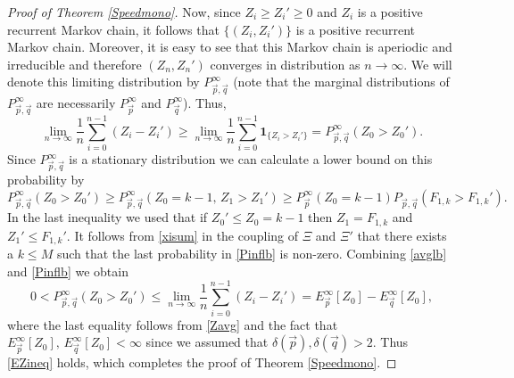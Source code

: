 \documentclass[reqno,letterpaper,11pt]{amsart}
\theoremstyle{remark}
\theoremstyle{definition}
\begin{document}
\begin{proof}[Proof of Theorem \ref{Speedmono}]
Now, since $Z_i \geq Z_i' \geq 0$ and $Z_i$ is a positive recurrent Markov chain, it follows that $\{(Z_i,Z_i')\}$ is a positive recurrent Markov chain. Moreover, it is easy to see that this Markov chain is aperiodic and irreducible and therefore $(Z_n,Z_n')$ converges in distribution as $n{\rightarrow}\infty$. We will denote this limiting distribution by $P_{{\vec{p}},{\vec{q}}}^\infty$ (note that the marginal distributions of $P_{{\vec{p}},{\vec{q}}}^\infty$ are necessarily $P_{\vec{p}}^\infty$ and $P_{\vec{q}}^\infty$). Thus, 
\begin{equation}\label{avglb}
 \lim_{n{\rightarrow}\infty} \frac{1}{n} \sum_{i=0}^{n-1} (Z_i - Z_i') \geq \lim_{n{\rightarrow}\infty} \frac{1}{n} \sum_{i=0}^{n-1} { \mathbf{1}_{ \{ {Z_i > Z_i'} \} } } = P_{{\vec{p}},{\vec{q}}}^\infty (Z_0 > Z_0'). 
\end{equation}
Since $P_{{\vec{p}},{\vec{q}}}^\infty$ is a stationary distribution we can calculate a lower bound on this probability by 
\begin{equation}\label{Pinflb}
 P_{{\vec{p}},{\vec{q}}}^\infty (Z_0 > Z_0') \geq P_{{\vec{p}},{\vec{q}}}^\infty ( Z_0 = k-1, \, Z_1 > Z_1') \geq P_{\vec{p}}^\infty( Z_0 = k-1) P_{{\vec{p}},{\vec{q}}}( F_{1,k} > F_{1,k}' ). 
\end{equation}
In the last inequality we used that if $Z_0' \leq Z_0 = k-1$ then $Z_1 = F_{1,k}$ and $Z_1' \leq F_{1,k}'$.  
It follows from \eqref{xisum} in the coupling of $\Xi$ and $\Xi'$ that there exists a $k \leq M$ such that the last probability in \eqref{Pinflb} is non-zero.
Combining \eqref{avglb} and \eqref{Pinflb} we obtain
\[
  0 < P_{{\vec{p}},{\vec{q}}}^\infty (Z_0 > Z_0') \leq \lim_{n{\rightarrow}\infty} \frac{1}{n} \sum_{i=0}^{n-1} (Z_i - Z_i') = E_{\vec{p}}^\infty[Z_0] - E_{\vec{q}}^\infty[Z_0], 
\]
where the last equality follows from \eqref{Zavg} and the fact that $E_{\vec{p}}^\infty[Z_0], \, E_{\vec{q}}^\infty[Z_0] < \infty$ since we assumed that ${\delta}({\vec{p}}),{\delta}({\vec{q}}) > 2$. Thus \eqref{EZineq} holds, which completes the proof of Theorem \ref{Speedmono}. 
\end{proof}



\end{document}
